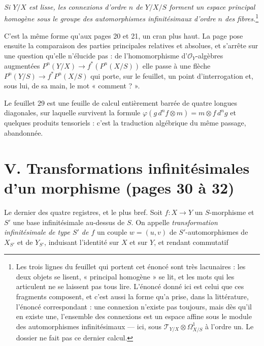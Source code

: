 \documentclass[11pt,a4paper]{article}
\begin{document}
\emph{Si $Y/X$ est lisse, les connexions d'ordre $n$ de $Y/X/S$ forment un
espace principal homogène sous le groupe des automorphismes infinitésimaux
d'ordre $n$ des fibres.}\footnote{Les trois lignes du feuillet qui portent cet
énoncé sont très lacunaires : les deux objets se lisent, « principal homogène »
se lit, et les mots qui les articulent ne se laissent pas tous lire. L'énoncé
donné ici est celui que ces fragments composent, et c'est aussi la forme qu'a
prise, dans la littérature, l'énoncé correspondant : une connexion n'existe pas
toujours, mais dès qu'il en existe une, l'ensemble des connexions est un espace
affine sous le module des automorphismes infinitésimaux — ici, sous
$\mathcal{T}_{Y/X} \otimes \Omega^{1}_{X/S}$ à l'ordre un. Le dossier ne fait
pas ce dernier calcul.}

C'est la même forme qu'aux pages 20 et 21, un cran plus haut. La page pose
ensuite la comparaison des parties principales relatives et absolues, et
s'arrête sur une question qu'elle n'élucide pas : de l'homomorphisme
d'$\mathcal{O}_{Y}$-algèbres augmentées $P^{n}(Y/X) \to f^{*}(P^{n}(X/S))$ elle
passe à une flèche $P^{n}(Y/S) \to f^{*}P^{n}(X/S)$ qui porte, sur le feuillet,
un point d'interrogation et, sous lui, de sa main, le mot « comment ? ».

Le feuillet 29 est une feuille de calcul entièrement barrée de quatre longues
diagonales, sur laquelle survivent la formule $\varphi(g\, d^{n}f \otimes m) = m
\otimes f\, d^{n}g$ et quelques produits tensoriels : c'est la traduction
algébrique du même passage, abandonnée.

\section*{V. Transformations infinitésimales d'un morphisme (pages 30 à 32)}

Le dernier des quatre registres, et le plus bref. Soit $f : X \to Y$ un
$S$-morphisme et $S'$ une base infinitésimale au-dessus de $S$. On appelle
\emph{transformation infinitésimale de type $S'$ de $f$} un couple $w = (u,v)$
de $S'$-automorphismes de $X_{S'}$ et de $Y_{S'}$, induisant l'identité sur $X$
et sur $Y$, et rendant commutatif

\end{document}
